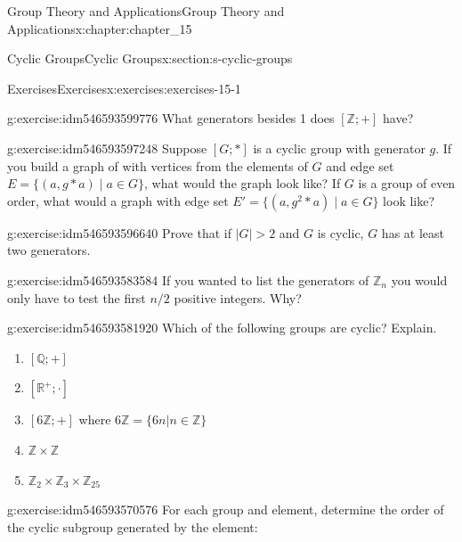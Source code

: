 \documentclass[oneside,10pt,]{book}
\numberwithin{equation}{section}
\begin{document}
\begin{chapterptx}{Group Theory and Applications}{}{Group Theory and Applications}{}{}{x:chapter:chapter_15}
\begin{sectionptx}{Cyclic Groups}{}{Cyclic Groups}{}{}{x:section:s-cyclic-groups}
%
%
\typeout{************************************************}
\typeout{************************************************}
%
\begin{exercises-subsection}{Exercises}{}{Exercises}{}{}{x:exercises:exercises-15-1}
\begin{divisionexercise}{1}{}{}{g:exercise:idm546593599776}%
What generators besides 1 does \([\mathbb{Z}; +]\) have?%
\end{divisionexercise}%
\begin{divisionexercise}{2}{}{}{g:exercise:idm546593597248}%
Suppose \([G;*]\) is a cyclic group with generator \(g\). If you build a graph of with vertices from the elements of \(G\) and edge set \(E= \{(a, g*a) \mid a\in G\}\), what would the graph look like?  If \(G\) is a group of even order, what would a graph with edge set \(E'= \{(a, g^2*a) \mid a\in G\}\) look like?%
\end{divisionexercise}%
\begin{divisionexercise}{3}{}{}{g:exercise:idm546593596640}%
Prove that if \(\lvert G \rvert >2\) and \(G\) is cyclic, \(G\) has at least two generators.%
\end{divisionexercise}%
\begin{divisionexercise}{4}{}{}{g:exercise:idm546593583584}%
If you wanted to list the generators of \(\mathbb{Z}_n\) you would only have to test the first \(n/2\) positive integers. Why?%
\end{divisionexercise}%
\begin{divisionexercise}{5}{}{}{g:exercise:idm546593581920}%
Which of the following groups are cyclic? Explain.%
\begin{enumerate}[label=(\alph*)]
\item{}\([\mathbb{Q}; +]\)%
\item{}\([\mathbb{R}^+;\cdot ]\)%
\item{}\([6\mathbb{Z}; +]\) where \(6\mathbb{Z} = \{6n |n \in  \mathbb{Z}\}\)%
\item{}\(\mathbb{Z} \times  \mathbb{Z}\)%
\item{}\(\mathbb{Z}_2\times  \mathbb{Z}_3 \times  \mathbb{Z}_{25}\)%
\end{enumerate}
%
\end{divisionexercise}%
\begin{divisionexercise}{6}{}{}{g:exercise:idm546593570576}%
For each group and element, determine the order of the cyclic subgroup generated by the element:%
\begin{enumerate}[label=(\alph*)]

\end{enumerate}
\end{divisionexercise}
\end{exercises-subsection}
\end{sectionptx}
\end{chapterptx}
\end{document}
